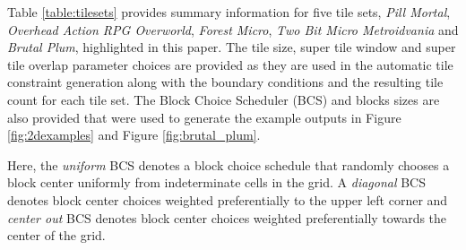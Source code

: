 

Table \ref{table:tilesets} provides summary information for five tile sets, \textit{Pill Mortal}, \textit{Overhead Action RPG Overworld},
\textit{Forest Micro}, \textit{Two Bit Micro Metroidvania} and \textit{Brutal Plum}, highlighted in this paper.
The tile size, super tile window and super tile overlap parameter choices are provided as they are used in the automatic tile constraint generation
along with the boundary conditions and the resulting tile count for each tile set.
The Block Choice Scheduler (BCS) and blocks sizes are also provided that were used to generate the example outputs in Figure \ref{fig:2dexamples} and Figure \ref{fig:brutal_plum}.

Here, the \textit{uniform} BCS denotes a block choice schedule that randomly chooses a block center uniformly from
indeterminate cells in the grid.
A \textit{diagonal} BCS denotes block center choices weighted preferentially to the upper left corner and
\textit{center out} BCS denotes block center choices weighted preferentially towards the center of the grid.

